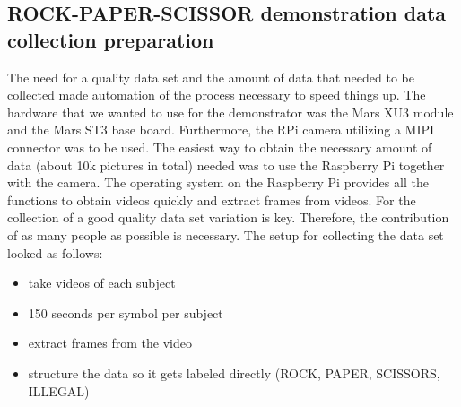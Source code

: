 \subsection{ROCK-PAPER-SCISSOR demonstration data collection preparation}
The need for a quality data set and the amount of data that needed to be collected made automation of the process necessary to speed things up. The hardware that we wanted to use for the demonstrator was the Mars XU3 module and the Mars ST3 base board. Furthermore, the RPi camera utilizing a \ac{MIPI} connector was to be used. The easiest way to obtain the necessary amount of data (about 10k pictures in total) needed was to use the Raspberry Pi together with the camera. The operating system on the Raspberry Pi provides all the functions to obtain videos quickly and extract frames from videos. For the collection of a good quality data set variation is key. Therefore, the contribution of as many people as possible is necessary. The setup for collecting the data set looked as follows:
\begin{itemize}
	\item take videos of each subject
	\item 150 seconds per symbol per subject
	\item extract frames from the video
	\item structure the data so it gets labeled directly (ROCK, PAPER, SCISSORS, ILLEGAL)
\end{itemize}
